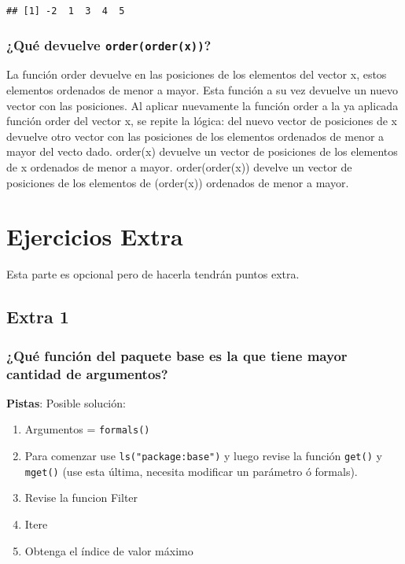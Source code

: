 \documentclass[
]{article}
\providecommand{\tightlist}{%
  \setlength{\itemsep}{0pt}\setlength{\parskip}{0pt}}
\begin{document}
\begin{verbatim}
## [1] -2  1  3  4  5
\end{verbatim}

\hypertarget{quuxe9-devuelve-orderorderx}{%
\subsubsection{\texorpdfstring{¿Qué devuelve
\texttt{order(order(x))}?}{¿Qué devuelve order(order(x))?}}\label{quuxe9-devuelve-orderorderx}}

La función order devuelve en las posiciones de los elementos del vector
x, estos elementos ordenados de menor a mayor. Esta función a su vez
devuelve un nuevo vector con las posiciones. Al aplicar nuevamente la
función order a la ya aplicada función order del vector x, se repite la
lógica: del nuevo vector de posiciones de x devuelve otro vector con las
posiciones de los elementos ordenados de menor a mayor del vecto dado.
order(x) devuelve un vector de posiciones de los elementos de x
ordenados de menor a mayor. order(order(x)) develve un vector de
posiciones de los elementos de (order(x)) ordenados de menor a mayor.

\hypertarget{ejercicios-extra}{%
\section{Ejercicios Extra}\label{ejercicios-extra}}

Esta parte es opcional pero de hacerla tendrán puntos extra.

\hypertarget{extra-1}{%
\subsection{Extra 1}\label{extra-1}}

\hypertarget{quuxe9-funciuxf3n-del-paquete-base-es-la-que-tiene-mayor-cantidad-de-argumentos}{%
\subsubsection{¿Qué función del paquete base es la que tiene mayor
cantidad de
argumentos?}\label{quuxe9-funciuxf3n-del-paquete-base-es-la-que-tiene-mayor-cantidad-de-argumentos}}

\textbf{Pistas}: Posible solución:

\begin{enumerate}
\def\labelenumi{\arabic{enumi}.}
\setcounter{enumi}{-1}
\tightlist
\item
  Argumentos = \texttt{formals()}
\item
  Para comenzar use \texttt{ls("package:base")} y luego revise la
  función \texttt{get()} y \texttt{mget()} (use esta última, necesita
  modificar un parámetro ó formals).
\item
  Revise la funcion Filter
\item
  Itere
\item
  Obtenga el índice de valor máximo
\end{enumerate}
\end{document}
